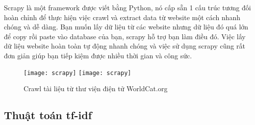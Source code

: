 Scrapy là một framework được viết bằng Python, nó cấp sẵn 1 cấu trúc tương đối hoàn chỉnh để thực hiện việc crawl và extract data từ website một cách nhanh chóng và dễ dàng. Bạn muốn lấy dữ liệu từ các website nhưng dữ liệu đó quá lớn để copy rồi paste vào database của bạn, scrapy hỗ trợ bạn làm điều đó. Việc lấy dữ liệu website hoàn toàn tự động nhanh chóng và việc sử dụng scrapy cũng rất đơn giản giúp bạn tiếp kiệm được nhiều thời gian và công sức.

 \begin{figure}[!htbp]
  \begin{center}
    \ifpdf
      \texttt{[image: scrapy]}
    \else
      \texttt{[image: scrapy]}
    \fi
    \caption{Crawl tài liệu từ thư viện điện tử WorldCat.org }
    \label{Scrapy}
  \end{center}
\end{figure}

\subsection{Thuật toán tf-idf}

